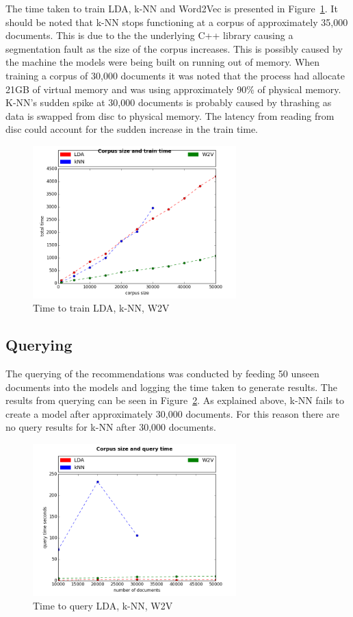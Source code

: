 The time taken to train LDA, k-NN and Word2Vec is presented in Figure~\ref{fig:TrainAll}.
It should be noted that k-NN stops functioning at a corpus of approximately 35,000 documents.
This is due to the the underlying C++ library causing a segmentation fault as the size of the corpus increases.
This is possibly caused by the machine the models were being built on running out of memory.
When training a corpus of 30,000 documents it was noted that the process had allocate 21GB of virtual memory and was using approximately 90\% of physical memory.
K-NN's sudden spike at 30,000 documents is probably caused by thrashing as data is swapped from disc to physical memory.
The latency from reading from disc could account for the sudden increase in the train time.

\begin{figure}[h]
    \centering
        \includegraphics[width=0.7\textwidth]{Figures/TrainAll.png}
    \caption{Time to train LDA, k-NN, W2V}
    \label{fig:TrainAll}
\end{figure}

\subsection{Querying}
The querying of the recommendations was conducted by feeding 50 unseen documents into the models and logging the time taken to generate results.
The results from querying can be seen in Figure~\ref{fig:queryAll}.
As explained above, k-NN fails to create a model after approximately 30,000 documents.
For this reason there are no query results for k-NN after 30,000 documents.

\begin{figure}[h]
    \centering
        \includegraphics[width=0.7\textwidth]{Figures/queryAll.png}
    \caption{Time to query LDA, k-NN, W2V}
    \label{fig:queryAll}
\end{figure}

